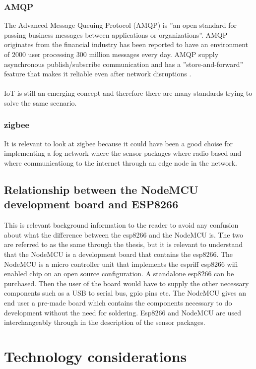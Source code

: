 \documentclass[]{uiophd}
\begin{document}
\subsection{AMQP}
The Advanced Message Queuing Protocol (AMQP) is ''an open standard for passing business messages between applications or organizations''\cite{amqp}. AMQP originates from the financial industry has been reported to have an environment of 2000 user processing 300 million messages every day. AMQP supply asynchronous publish/subscribe communication and has a ''store-and-forward'' feature that makes it reliable even after network disruptions \cite{karagiannis2015survey}. 
\\\\
IoT is still an emerging concept and therefore there are many standards trying to solve the same scenario.

\subsection{zigbee}
It is relevant to look at zigbee because it could have been a good choise for implementing a fog network where the sensor packages where radio based and where communicationg to the internet through an edge node in the network.

\section{Relationship between the NodeMCU development board and ESP8266}
This is relevant background information to the reader to avoid any confusion about what the difference between the esp8266 and the NodeMCU is. The two are referred to as the same through the thesis, but it is relevant to understand that the NodeMCU is a development board that contains the esp8266. The NodeMCU is a micro controller unit that implements the espriff esp8266 wifi enabled chip on an open source configuration. A standalone esp8266 can be purchased. Then the user of the board would have to supply the other necessary components such as a USB to serial bus, gpio pins etc. The NodeMCU gives an end user a pre-made board which contains the components necessary to do development without the need for soldering. Esp8266 and NodeMCU are used interchangeably through in the description of the sensor packages.

\chapter{Technology considerations}
\end{document}
